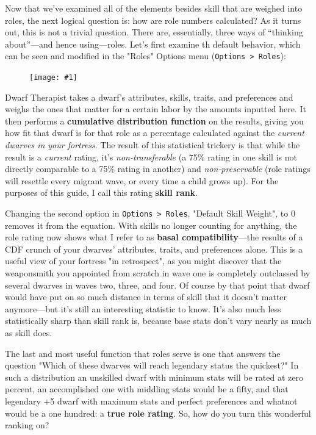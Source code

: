 \documentclass[]{article}
\newcommand{\fullfigure}[1] {
\begin{figure}[h!]
\texttt{[image: \#1]}
\end{figure}
}
\begin{document}
Now that we've examined all of the elements besides skill that are weighed into roles, the next logical
question is: how are role numbers calculated? As it turns out, this is not a trivial question.
There are, essentially, three ways of ``thinking about''---and hence using---roles. Let's first examine
th default behavior, which can be seen and modified in the "Roles" Options menu (\texttt{Options >
Roles}):
\fullfigure{Sec3Fig1}

\newpage
Dwarf Therapist takes a dwarf's attributes, skills, traits, and preferences and weighs the ones that
matter for a certain labor by the amounts inputted here. It then performs a \textbf{cumulative
distribution function} on the results, giving you how fit that dwarf is for that role as a percentage
calculated against the \emph{current dwarves in your fortress}. The result of this statistical trickery
is that while the result is a \emph{current} rating, it's \emph{non-transferable} (a 75\% rating in one
skill is not directly comparable to a 75\% rating in another) and \emph{non-preservable} (role ratings
will resettle every migrant wave, or every time a child grows up). For the purposes of this guide, I call
this rating \textbf{skill rank}.

Changing the second option in \texttt{Options > Roles}, "Default Skill Weight", to 0 removes it from the
equation. With skills no longer counting for anything, the role rating now shows what I refer to as
\textbf{basal compatibility}---the results of a CDF crunch of your dwarves' attributes, traits, and
preferences alone. This is a useful view of your fortress "in retrospect", as you might discover that the
weaponsmith you appointed from scratch in wave one is completely outclassed by several dwarves in waves
two, three, and four. Of course by that point that dwarf would have put on so much distance in terms of
skill that it doesn't matter anymore---but it's still an interesting statistic to know. It's also much
less statistically sharp than skill rank is, because base stats don't vary nearly as much as skill does.

The last and most useful function that roles serve is one that answers the question "Which of these
dwarves will reach legendary status the quickest?" In such a distribution an unskilled dwarf with minimum
stats will be rated at zero percent, an accomplished one with middling stats would be a fifty, and that
legendary +5 dwarf with maximum stats and perfect preferences and whatnot would be a one hundred: a
\textbf{true role rating}. So, how do you turn this wonderful ranking on?
\end{document}
